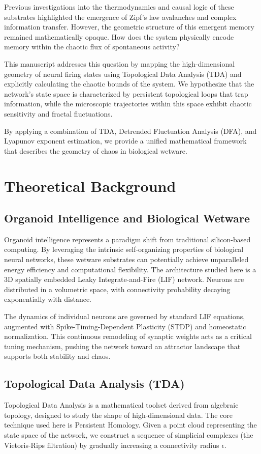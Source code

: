 \documentclass[11pt,a4paper]{article}
\begin{document}
Previous investigations into the thermodynamics and causal logic of these substrates highlighted the emergence of Zipf's law avalanches and complex information transfer. However, the geometric structure of this emergent memory remained mathematically opaque. How does the system physically encode memory within the chaotic flux of spontaneous activity?

This manuscript addresses this question by mapping the high-dimensional geometry of neural firing states using Topological Data Analysis (TDA) and explicitly calculating the chaotic bounds of the system. We hypothesize that the network's state space is characterized by persistent topological loops that trap information, while the microscopic trajectories within this space exhibit chaotic sensitivity and fractal fluctuations. 

By applying a combination of TDA, Detrended Fluctuation Analysis (DFA), and Lyapunov exponent estimation, we provide a unified mathematical framework that describes the geometry of chaos in biological wetware.

\section{Theoretical Background}

\subsection{Organoid Intelligence and Biological Wetware}
Organoid intelligence represents a paradigm shift from traditional silicon-based computing. By leveraging the intrinsic self-organizing properties of biological neural networks, these wetware substrates can potentially achieve unparalleled energy efficiency and computational flexibility. The architecture studied here is a 3D spatially embedded Leaky Integrate-and-Fire (LIF) network. Neurons are distributed in a volumetric space, with connectivity probability decaying exponentially with distance. 

The dynamics of individual neurons are governed by standard LIF equations, augmented with Spike-Timing-Dependent Plasticity (STDP) and homeostatic normalization. This continuous remodeling of synaptic weights acts as a critical tuning mechanism, pushing the network toward an attractor landscape that supports both stability and chaos.

\subsection{Topological Data Analysis (TDA)}
Topological Data Analysis is a mathematical toolset derived from algebraic topology, designed to study the shape of high-dimensional data. The core technique used here is Persistent Homology. Given a point cloud representing the state space of the network, we construct a sequence of simplicial complexes (the Vietoris-Rips filtration) by gradually increasing a connectivity radius $\epsilon$. 
\end{document}
